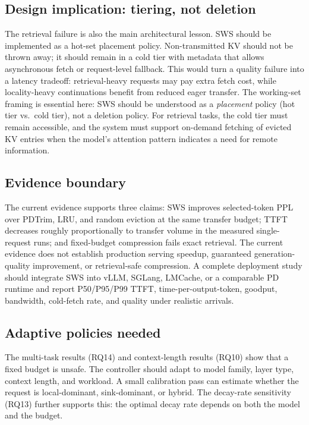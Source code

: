 \documentclass[11pt]{article}
\newcommand{\method}{SWS}
\newcommand{\sws}{SWS}
\theoremstyle{definition}
\theoremstyle{plain}
\begin{document}
\subsection{Design implication: tiering, not deletion}
The retrieval failure is also the main architectural lesson.  \sws{} should be implemented as a hot-set placement policy.  Non-transmitted KV should not be thrown away; it should remain in a cold tier with metadata that allows asynchronous fetch or request-level fallback.  This would turn a quality failure into a latency tradeoff: retrieval-heavy requests may pay extra fetch cost, while locality-heavy continuations benefit from reduced eager transfer.  The working-set framing is essential here: \sws{} should be understood as a \emph{placement} policy (hot tier vs.\ cold tier), not a deletion policy.  For retrieval tasks, the cold tier must remain accessible, and the system must support on-demand fetching of evicted KV entries when the model's attention pattern indicates a need for remote information.

\subsection{Evidence boundary}
The current evidence supports three claims: \method{} improves selected-token PPL over PDTrim, LRU, and random eviction at the same transfer budget; TTFT decreases roughly proportionally to transfer volume in the measured single-request runs; and fixed-budget compression fails exact retrieval.  The current evidence does not establish production serving speedup, guaranteed generation-quality improvement, or retrieval-safe compression.  A complete deployment study should integrate \method{} into vLLM, SGLang, LMCache, or a comparable PD runtime and report P50/P95/P99 TTFT, time-per-output-token, goodput, bandwidth, cold-fetch rate, and quality under realistic arrivals.

\subsection{Adaptive policies needed}
The multi-task results (RQ14) and context-length results (RQ10) show that a fixed budget is unsafe.  The controller should adapt to model family, layer type, context length, and workload.  A small calibration pass can estimate whether the request is local-dominant, sink-dominant, or hybrid.  The decay-rate sensitivity (RQ13) further supports this: the optimal decay rate depends on both the model and the budget.
\end{document}

